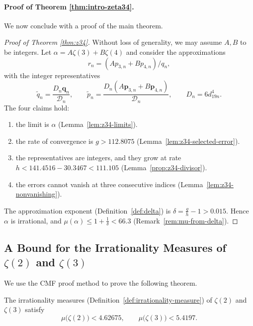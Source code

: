 \paragraph{Proof of Theorem \ref{thm:intro-zeta34}.}

We now conclude with a proof of the main theorem.
\begin{proof}[Proof of Theorem \ref{thm:z34}]
Without loss of generality, we may assume $A, B$ to be integers. Let $\alpha=A\zeta(3)+B\zeta(4)$ and consider the approximations 
\[
r_n=(Ap_{3,n}+Bp_{4,n})/q_n,
\] 
with the integer representatives
\[
  \widetilde q_n=\frac{D_n\mathbf q_n}{\mathcal D_n},\qquad
  \widetilde p_n=\frac{D_n(A\mathbf p_{3,n}+B\mathbf p_{4,n})}{\mathcal D_n},
  \qquad D_n=6d_{19n}^4 .
\]
The four claims hold:
\begin{enumerate}
\item the limit is $\alpha$ (Lemma~\ref{lem:z34-limits}).
\item the rate of convergence is $g>112.8075$
  (Lemma~\ref{lem:z34-selected-error}).
\item the representatives are integers, and they grow at rate
  $h<141.4516-30.3467<111.105$ 
  (Lemma~\ref{prop:z34-divisor}).
\item the errors cannot vanish at three consecutive indices
  (Lemma~\ref{lem:z34-nonvanishing}).
\end{enumerate}
The approximation exponent (Definition~\ref{def:delta}) is $\delta=\frac gh-1>0.015$. Hence $\alpha$ is irrational, and $\mu(\alpha)\le1+\frac1\delta<66.3$ (Remark~\ref{rem:mu-from-delta}).
\end{proof}


\subsection{A Bound for the Irrationality Measures of
\texorpdfstring{$\zeta(2)$ and $\zeta(3)$}{ζ(2) and ζ(3)}}
\label{subsec:z23}
We use the CMF proof method to prove the following theorem.

\begin{theorem}\label{thm:z23-measures}
The irrationality measures (Definition~\ref{def:irrationality-measure}) of
$\zeta(2)$ and $\zeta(3)$ satisfy
\[
  \mu\bigl(\zeta(2)\bigr)<4.62675,
  \qquad
  \mu\bigl(\zeta(3)\bigr)<5.4197 .
\]
\end{theorem}


